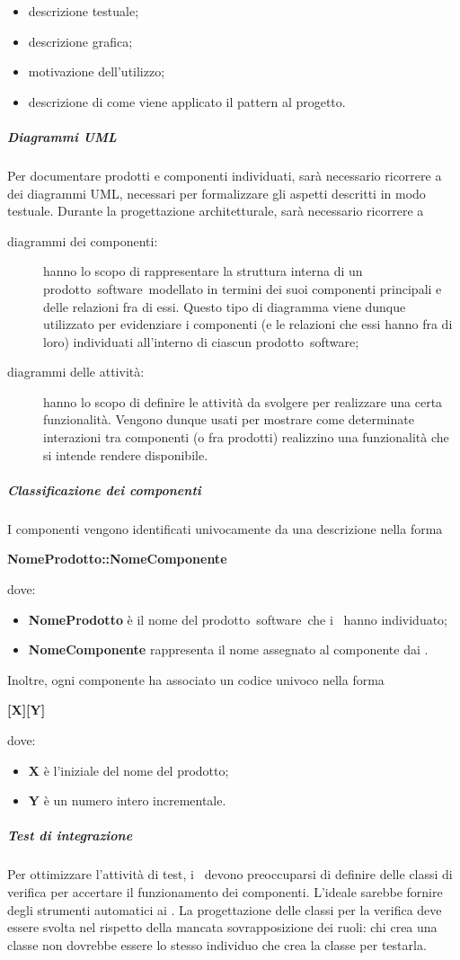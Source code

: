 \documentclass[../NormeProgetto.text]{subfiles}
\begin{document}
				\begin{itemize}
					\item descrizione testuale;
					\item descrizione grafica;
					\item motivazione dell'utilizzo;
					\item descrizione di come viene applicato il pattern al progetto.
				\end{itemize}
			\subparagraph{Diagrammi UML}
				Per documentare prodotti e componenti individuati, sarà necessario ricorrere a dei diagrammi UML\g, necessari per formalizzare gli aspetti descritti in modo testuale. Durante la progettazione architetturale, sarà necessario ricorrere a 
				\begin{description}
					\item[diagrammi dei componenti:]  hanno lo scopo di rappresentare la struttura interna di un prodotto\g\ software\g\ modellato in termini dei suoi componenti principali e delle relazioni fra di essi. Questo tipo di diagramma viene dunque utilizzato per evidenziare i componenti (e le relazioni che essi hanno fra di loro) individuati all'interno di ciascun prodotto\g\ software\g;
					\item[diagrammi delle attività:]  hanno lo scopo di definire le attività da svolgere per realizzare una certa funzionalità. Vengono dunque usati per mostrare come determinate interazioni tra
componenti (o fra prodotti) realizzino una funzionalità che si intende rendere disponibile.
				\end{description}
			\subparagraph{Classificazione dei componenti}
				I componenti vengono identificati univocamente da una descrizione nella forma \begin{center}\textbf{NomeProdotto::NomeComponente}\end{center} dove:
				\begin{itemize}
					\item \textbf{NomeProdotto} è il nome del prodotto\g\ software\g\ che i \progettisti\ hanno individuato;
					\item \textbf{NomeComponente} rappresenta il nome assegnato al componente dai \progettisti.
				\end{itemize}
				Inoltre, ogni componente ha associato un codice univoco nella forma \begin{center}\textbf{[X][Y]}\end{center} dove:
				\begin{itemize}
					\item \textbf{X} è l'iniziale del nome del prodotto\g;
					\item \textbf{Y} è un numero intero incrementale.
				\end{itemize}
			\subparagraph{Test di integrazione}
				Per ottimizzare l'attività di test, i \progettisti\ devono preoccuparsi di definire delle classi di verifica per accertare il funzionamento dei componenti. L'ideale sarebbe fornire degli strumenti automatici ai \verificatori . La progettazione delle classi per la verifica deve essere svolta nel rispetto della mancata sovrapposizione dei ruoli: chi crea una classe non dovrebbe essere lo stesso individuo che crea la classe per testarla.
\end{document}
